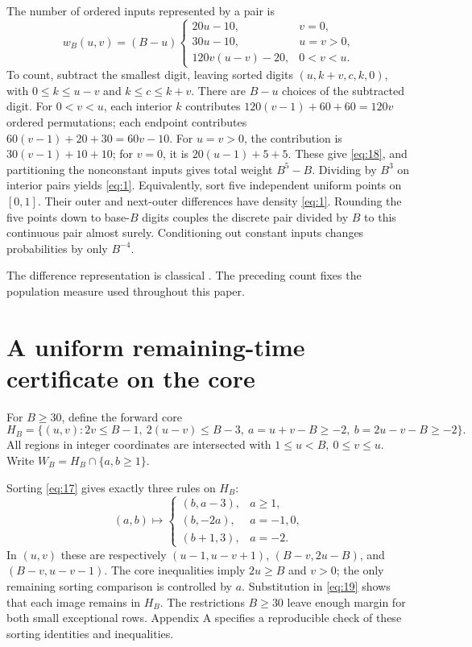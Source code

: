 \documentclass[11pt]{amsart}
\begin{document}
The number of ordered inputs represented by a pair is \begin{equation}\label{eq:18}
w_B(u,v)=(B-u)
 \begin{cases}
 20u-10,&v=0,\\
 30u-10,&u=v>0,\\
 120v(u-v)-20,&0<v<u.
 \end{cases}
\end{equation} To count, subtract the smallest digit, leaving sorted digits \((u,k+v,c,k,0)\), with \(0\le k\le u-v\) and \(k\le c\le k+v\). There are \(B-u\) choices of the subtracted digit. For \(0<v<u\), each interior \(k\) contributes \(120(v-1)+60+60=120v\) ordered permutations; each endpoint contributes \(60(v-1)+20+30=60v-10\). For \(u=v>0\), the contribution is \(30(v-1)+10+10\); for \(v=0\), it is \(20(u-1)+5+5\). These give \eqref{eq:18}, and partitioning the nonconstant inputs gives total weight \(B^5-B\). Dividing by \(B^3\) on interior pairs yields \eqref{eq:1}. Equivalently, sort five independent uniform points on \([0,1]\). Their outer and next-outer differences have density \eqref{eq:1}. Rounding the five points down to base-\(B\) digits couples the discrete pair divided by \(B\) to this continuous pair almost surely. Conditioning out constant inputs changes probabilities by only \(B^{-4}\).

The difference representation is classical \cite[Section~1]{Pri}. The preceding count fixes the population measure used throughout this paper.

\section{A uniform remaining-time certificate on the core}

For \(B\ge30\), define the forward core \begin{equation}\label{eq:19}
H_B=\{(u,v):2v\le B-1,\ 2(u-v)\le B-3,
                  \ a=u+v-B\ge-2,\ b=2u-v-B\ge-2\}.
\end{equation} All regions in integer coordinates are intersected with \(1\le u<B,\ 0\le v\le u\). Write \(W_B=H_B\cap\{a,b\ge1\}\).

Sorting \eqref{eq:17} gives exactly three rules on \(H_B\): \begin{equation}\label{eq:20}
(a,b)\longmapsto
 \begin{cases}
 (b,a-3),&a\ge1,\\
 (b,-2a),&a=-1,0,\\
 (b+1,3),&a=-2.
 \end{cases}
\end{equation} In \((u,v)\) these are respectively \((u-1,u-v+1)\), \((B-v,2u-B)\), and \((B-v,u-v-1)\). The core inequalities imply \(2u\ge B\) and \(v>0\); the only remaining sorting comparison is controlled by \(a\). Substitution in \eqref{eq:19} shows that each image remains in \(H_B\). The restrictions \(B\ge30\) leave enough margin for both small exceptional rows. Appendix A specifies a reproducible check of these sorting identities and inequalities.
\end{document}

